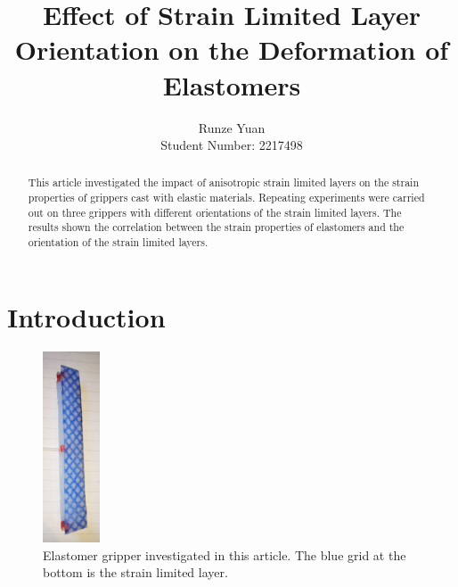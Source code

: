 \documentclass[conference]{IEEEtran}
\begin{document}
\title{Effect of Strain Limited Layer Orientation on the Deformation of Elastomers}
\author{
    Runze Yuan
    \\
    Student Number: 2217498
}

\maketitle

\begin{abstract}
This article investigated the impact of anisotropic strain limited layers on the strain properties of grippers cast with elastic materials. Repeating experiments were carried out on three grippers with different orientations of the strain limited layers. The results shown the correlation between the strain properties of elastomers and the orientation of the strain limited layers.
\end{abstract}

% 

\section{Introduction}


\begin{figure}
  \label{fig:Elastomer}
  \centering
  \includegraphics[width=0.15\textwidth]{pics/弹性体示意图.png}
  \caption{Elastomer gripper investigated in this article. The blue grid at the bottom is the strain limited layer.}
\end{figure}
\end{document}

